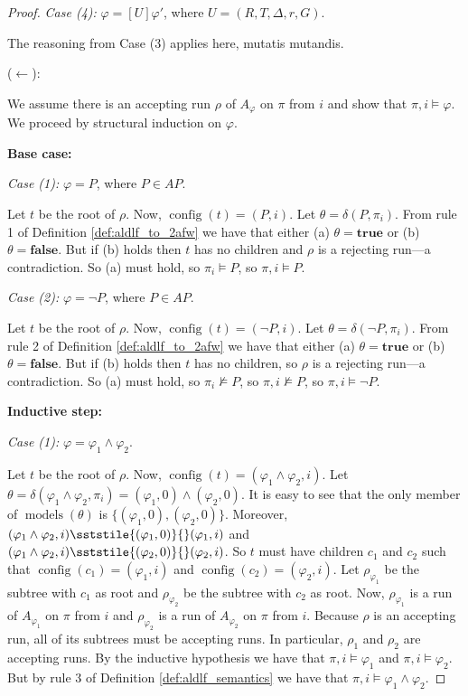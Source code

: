 \documentclass[10pt,a4paper]{amsart}
\theoremstyle{plain}
\theoremstyle{definition}
\theoremstyle{definition}
\newcommand{\sderives}[1]{\sststile{#1}{}}
\newcommand{\bbox}[1]{[ #1 ]}
\DeclareMathOperator{\config}{config}
\DeclareMathOperator{\?}{?}
\DeclareMathOperator{\mymodels}{models}
\begin{document}
\begin{proof}
    \textit{Case (4):} $\varphi = \bbox{U}\varphi'$, where $U = (R,T,\Delta,r,G)$.

    The reasoning from Case (3) applies here, mutatis mutandis.


    ($\leftarrow$):

    We assume there is an accepting run $\rho$ of $A_\varphi$ on $\pi$ from $i$ and show that $\pi,i \models \varphi$.
    We proceed by structural induction on $\varphi$.

    \textbf{Base case:}

    \textit{Case (1):} $\varphi = P$, where $P \in AP$.

    Let $t$ be the root of $\rho$. Now, $\config(t) = (P, i)$. Let $\theta = \delta(P,\pi_i)$. From rule 1 of
    Definition \ref{def:aldlf_to_2afw} we have that either (a) $\theta = \textbf{true}$ or (b) $\theta = \textbf{false}$.
    But if (b) holds then $t$ has no children and $\rho$ is a rejecting run\----a contradiction. So (a) must hold, so
    $\pi_i \models P$, so $\pi,i \models P$.

    \textit{Case (2):} $\varphi = \neg P$, where $P \in AP$.

    Let $t$ be the root of $\rho$. Now, $\config(t) = (\neg P,i)$. Let $\theta = \delta(\neg P,\pi_i)$.
    From rule 2 of Definition \ref{def:aldlf_to_2afw} we have that either (a) $\theta = \textbf{true}$ or
    (b) $\theta = \textbf{false}$. But if (b) holds then $t$ has no children, so $\rho$ is a rejecting run\----a contradiction.
    So (a) must hold, so $\pi_i \not\models P$, so $\pi,i \not\models P$, so $\pi,i \models \neg P$.


    \textbf{Inductive step:}

    \textit{Case (1):} $\varphi = \varphi_1 \wedge \varphi_2$.

    Let $t$ be the root of $\rho$. Now, $\config(t) = (\varphi_1 \wedge \varphi_2,i)$.
    Let $\theta = \delta(\varphi_1 \wedge \varphi_2,\pi_i) = (\varphi_1,0) \wedge (\varphi_2,0)$.
    It is easy to see that the only member of $\mymodels(\theta)$ is $\{(\varphi_1,0),(\varphi_2,0)\}$.
    Moreover, $(\varphi_1 \wedge \varphi_2,i) \sderives{(\varphi_1,0)} (\varphi_1,i)$ and
    $(\varphi_1 \wedge \varphi_2,i) \sderives{(\varphi_2,0)} (\varphi_2,i)$. So $t$ must have children
    $c_1$ and $c_2$ such that $\config(c_1) = (\varphi_1,i)$ and $\config(c_2) = (\varphi_2,i)$. Let
    $\rho_{\varphi_1}$ be the subtree with $c_1$ as root and $\rho_{\varphi_2}$ be the subtree with $c_2$
    as root. Now, $\rho_{\varphi_1}$ is a run of $A_{\varphi_1}$ on $\pi$ from $i$ and $\rho_{\varphi_2}$ is
    a run of $A_{\varphi_2}$ on $\pi$ from $i$. Because $\rho$ is an accepting run, all of its subtrees
    must be accepting runs. In particular, $\rho_1$ and $\rho_2$ are accepting runs. By the inductive hypothesis
    we have that $\pi,i \models \varphi_1$ and $\pi,i \models \varphi_2$. But by rule 3 of Definition \ref{def:aldlf_semantics}
    we have that $\pi,i \models \varphi_1 \wedge \varphi_2$.



\end{proof}
\end{document}
